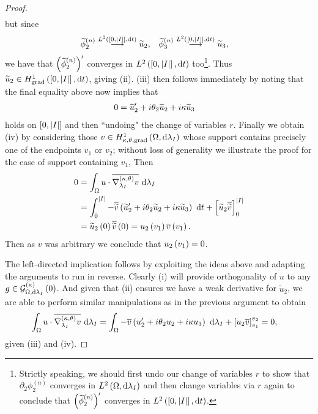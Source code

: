 \begin{proof}
\begin{align*}
	\end{align*}
	but since
	\begin{align*}
		\widetilde{\phi}_2^{(n)} \overset{L^{2}\left( \left[ 0,\left\lvert I \right\rvert \right],\mathrm{d}t \right)}{\longrightarrow} \widetilde{u}_2,
		&\quad \widetilde{\phi}_3^{(n)} \overset{L^{2}\left( \left[ 0,\left\lvert I \right\rvert \right],\mathrm{d}t \right)}{\longrightarrow} \widetilde{u}_3,
	\end{align*}
	we have that $\left( \widetilde{\phi}_2^{(n)} \right)'$ converges in $L^{2}\left( \left[ 0,\left\lvert I \right\rvert \right],\mathrm{d}t \right)$ too\footnote{Strictly speaking, we should first undo our change of variables $r$ to show that $\partial_2\phi_2^{(n)}$ converges in $L^{2}\left( \Omega,\mathrm{d}\lambda_I \right)$ and then change variables via $r$ again to conclude that $\left( \widetilde{\phi}_2^{(n)} \right)'$ converges in $L^{2}\left( \left[ 0,\left\lvert I \right\rvert \right],\mathrm{d}t \right)$.}.
	Thus $\widetilde{u}_2\in H^1_\mathrm{grad}\left( \left[ 0,\left\lvert I \right\rvert \right], \mathrm{d}t \right)$, giving (ii).
	(iii) then follows immediately by noting that the final equality above now implies that
	\begin{align*}
		0 &= \widetilde{u}_2' + i\theta_2\widetilde{u}_2 + i\kappa\widetilde{u}_3
	\end{align*}
	holds on $\left[ 0,\left\lvert I \right\rvert \right]$ and then ``undoing" the change of variables $r$.
	Finally we obtain (iv) by considering those $v\in H^1_{\kappa,\theta,\mathrm{grad}}\left( \Omega, \mathrm{d}\lambda_I \right)$ whose support contains precisely one of the endpoints $v_1$ or $v_2$; without loss of generality we illustrate the proof for the case of support containing $v_1$,
	Then
	\begin{align*}
		0 &= \int_{\Omega} u\cdot\overline{\nabla^{\left( \kappa, \theta \right)}_{\lambda_I}v}  \ \mathrm{d}\lambda_I \\
		&= \int_0^{\left\lvert I \right\rvert} -\overline{\widetilde{v}}\left( \widetilde{u}_2' + i\theta_2\widetilde{u}_2 + i\kappa\widetilde{u}_3 \right) \ \mathrm{d} t + \left[ \widetilde{u}_2\overline{\widetilde{v}} \right]_0^{\left\lvert I \right\rvert} \\
		&= \widetilde{u}_2\left( 0 \right)\overline{\widetilde{v}}\left( 0 \right)
		= u_2\left( v_1 \right)\overline{v}\left( v_1 \right).
	\end{align*}
	Then as $v$ was arbitrary we conclude that $u_2\left( v_1 \right)=0$. \newline
	
	The left-directed implication follows by exploiting the ideas above and adapting the arguments to run in reverse.
	Clearly (i) will provide orthogonality of $u$ to any $g\in\mathcal{G}_{ \Omega, \mathrm{d}\lambda_I}^{(\kappa)}\left( 0 \right)$.
	And given that (ii) ensures we have a weak derivative for $\widetilde{u}_2$, we are able to perform similar manipulations as in the previous argument to obtain
	\begin{align*}
		\int_{\Omega} u\cdot\overline{\nabla^{\left( \kappa, \theta \right)}_{\lambda_I}v}  \ \mathrm{d}\lambda_I
		&= \int_{\Omega} -\overline{v}\left( u_2' + i\theta_2 u_2 + i\kappa u_3 \right)  \ \mathrm{d}\lambda_I + \left[ u_2\overline{v} \right]_{v_1}^{v_2}
		= 0,
	\end{align*}
	given (iii) and (iv).
\end{proof}
